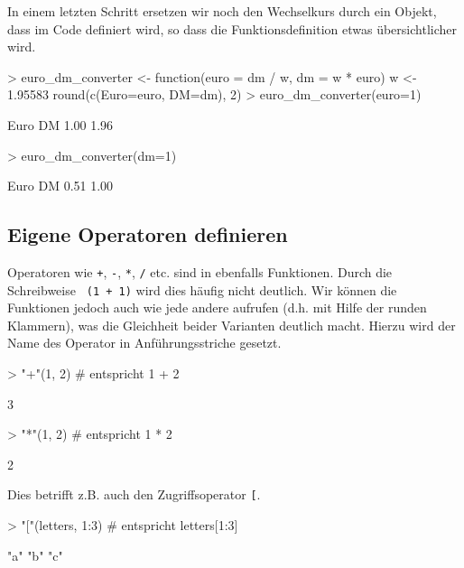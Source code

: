 \documentclass[12pt, a4paper,twoside,openany,x11names,svgnames]{memoir}
\begin{document}
In einem letzten Schritt ersetzen wir noch den Wechselkurs durch ein Objekt, dass im Code definiert wird, so dass die Funktionsdefinition etwas übersichtlicher wird.

\begin{Schunk}
\begin{Sinput}
> euro_dm_converter <- function(euro = dm / w, 
                               dm = w * euro){
   w <- 1.95583
   round(c(Euro=euro, DM=dm), 2)
 }
> euro_dm_converter(euro=1)
\end{Sinput}
\begin{Soutput}
Euro   DM 
1.00 1.96 
\end{Soutput}
\begin{Sinput}
> euro_dm_converter(dm=1)
\end{Sinput}
\begin{Soutput}
Euro   DM 
0.51 1.00 
\end{Soutput}
\end{Schunk}


\subsection{Eigene Operatoren definieren}

Operatoren wie \verb!+!, \verb!-!, \verb!*!, \verb!/! etc. sind in \R{} ebenfalls Funktionen. Durch die Schreibweise \texttt{ (1 + 1)} wird dies häufig nicht deutlich. Wir können die Funktionen jedoch auch wie jede andere aufrufen (d.h. mit Hilfe der runden Klammern), was die Gleichheit beider Varianten deutlich macht. Hierzu wird der Name des Operator in Anführungsstriche gesetzt.

\begin{Schunk}
\begin{Sinput}
> "+"(1, 2)         # entspricht 1 + 2
\end{Sinput}
\begin{Soutput}
[1] 3
\end{Soutput}
\begin{Sinput}
> "*"(1, 2)         # entspricht 1 * 2
\end{Sinput}
\begin{Soutput}
[1] 2
\end{Soutput}
\end{Schunk}

Dies betrifft z.B. auch den Zugriffsoperator \texttt{[}. 

\begin{Schunk}
\begin{Sinput}
> "["(letters, 1:3)       # entspricht letters[1:3]
\end{Sinput}
\begin{Soutput}
[1] "a" "b" "c"
\end{Soutput}
\end{Schunk}
\end{document}

